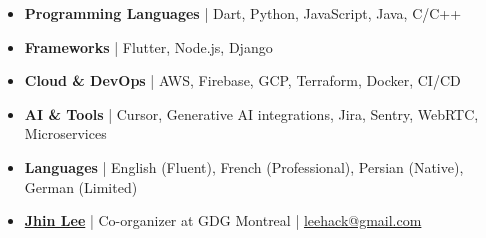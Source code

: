\documentclass[letterpaper,11pt]{article}
\begin{document}
\begin{itemize}[leftmargin=*, noitemsep, topsep=0pt, partopsep=0pt]
      \item
            \textbf{Programming Languages} | Dart, Python, JavaScript, Java, C/C++

      \item \BigGap
            \textbf{Frameworks} | Flutter, Node.js, Django

      \item \BigGap
            \textbf{Cloud \& DevOps} | AWS, Firebase, GCP, Terraform, Docker, CI/CD

      \item \BigGap
            \textbf{AI \& Tools} | Cursor, Generative AI integrations, Jira, Sentry, WebRTC, Microservices

      \item \BigGap
            \textbf{Languages} | English (Fluent), French (Professional), Persian (Native), German (Limited)

\end{itemize}




\begin{itemize}[leftmargin=*, noitemsep, topsep=0pt, partopsep=0pt]
      \item
            \href{https://linkedin.com/in/leehack}
            {\textbf{Jhin Lee}} | Co-organizer at GDG Montreal | \href{mailto:leehack@gmail.com}{leehack@gmail.com}

\end{itemize}
\end{document}

